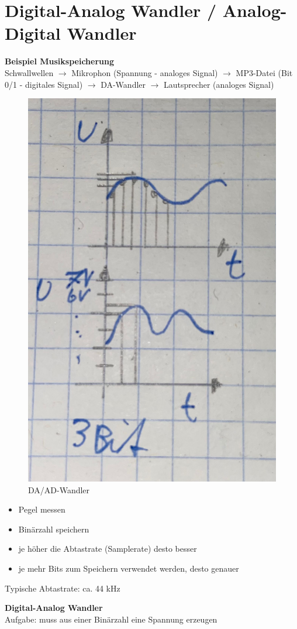 \chapter{Digital-Analog Wandler / Analog-Digital Wandler}
\textbf{Beispiel Musikspeicherung} \\
Schwallwellen $\rightarrow$ Mikrophon (Spannung - analoges Signal) $\rightarrow$ MP3-Datei (Bit 0/1 - digitales Signal) $\rightarrow$ DA-Wandler $\rightarrow$ Lautsprecher (analoges Signal)

\begin{figure}[H]
	\centering
	\includegraphics[width=0.2\linewidth]{figures/daad1.jpeg}
	\caption{DA/AD-Wandler}
\end{figure}

\begin{itemize}
	\item Pegel messen
	\item Binärzahl speichern
	\item je höher die Abtastrate (Samplerate) desto besser
	\item je mehr Bits zum Speichern verwendet werden, desto genauer
\end{itemize}
Typische Abtastrate: ca. 44 kHz

\textbf{Digital-Analog Wandler} \\
Aufgabe: muss aus einer Binärzahl eine Spannung erzeugen









